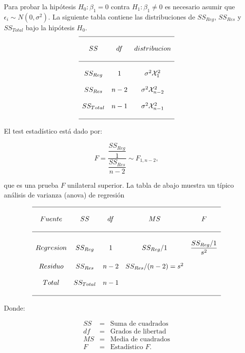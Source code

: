 Para probar la hipótesis $H_0:\beta_1=0$ contra $H_1:\beta_1\neq 0$ es necesario asumir que $\epsilon_i\sim N\left(0,\sigma^2\right)$. La siguiente tabla contiene las distribuciones de $SS_{Reg}$, $SS_{Res}$ y $SS_{Total}$ bajo la hipótesis $H_0$.\\

$$
\begin{array}{ccc}
    \hline\\
    SS & df & distribucion\\\\
    \hline\\
    SS_{Reg} & 1 & \sigma^2\mathcal{X}^2_1\\\\
    SS_{Res} & n-2 & \sigma^2\mathcal{X}^2_{n-2}\\\\
    SS_{Total} & n-1 & \sigma^2\mathcal{X}^2_{n-1}\\\\
    \hline
\end{array}
$$

El test estadístico está dado por:

\begin{tcolorbox}
    $$F=\dfrac{\dfrac{SS_{Reg}}{1}}{\dfrac{SS_{Res}}{n-2}}\sim F_{1,n-2},$$
\end{tcolorbox}

que es una prueba $F$ unilateral superior. La tabla de abajo muestra un típico análisis de varianza (anova) de regresión 

$$
\begin{array}{ccccc}
    \hline\\
    Fuente & SS & df & MS & F\\\\
    \hline\\
    Regresion & SS_{Reg} & 1 & SS_{Reg}/1 & \dfrac{SS_{Reg}/1}{s^2}\\\\
    Residuo & SS_{Res} & n-2 & SS_{Res}/(n-2)=s^2 & \\\\
    Total & SS_{Total} & n-1 & \\\\
    \hline
\end{array}
$$

Donde:

$$
\begin{array}{rcl}
    SS &=& \mbox{Suma de cuadrados}\\
    df &=& \mbox{Grados de libertad}\\
    MS &=& \mbox{Media de cuadrados}\\
    F &=& \mbox{Estadístico $F$}.
\end{array}
$$
\vspace{0.5cm}

